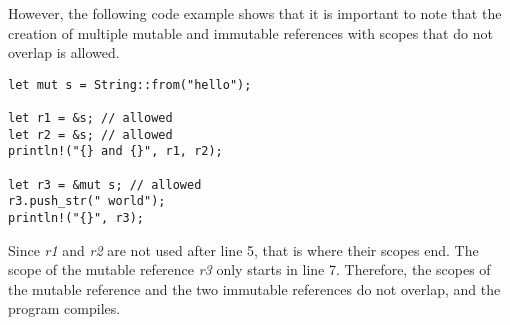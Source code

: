 \documentclass[sigplan,11pt,nonacm]{acmart}
\begin{document}
However, the following code example \cite{rust-book} shows that it is important to note that the creation of multiple mutable and immutable references with scopes that do not overlap is allowed.

\begin{lstlisting}
let mut s = String::from("hello");

let r1 = &s; // allowed
let r2 = &s; // allowed
println!("{} and {}", r1, r2);

let r3 = &mut s; // allowed
r3.push_str(" world");
println!("{}", r3);
\end{lstlisting}

Since \emph{r1} and \emph{r2} are not used after line 5, that is where their scopes end.
The scope of the mutable reference \emph{r3} only starts in line 7.
Therefore, the scopes of the mutable reference and the two immutable references do not overlap, and the program compiles.











\end{document}
